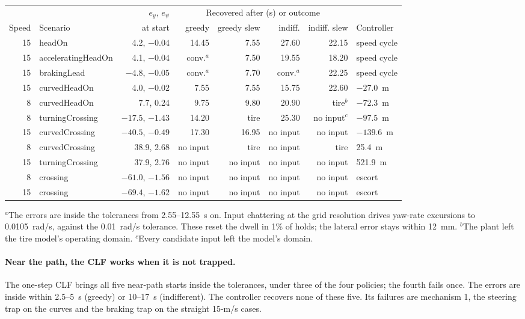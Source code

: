 \documentclass[11pt]{article}
\begin{document}
\begin{center}\footnotesize
\begin{tabular}{rlrrrrrl}
\toprule
 & & $e_y,\,e_\psi$ & \multicolumn{4}{c}{Recovered after (s) or outcome} & \\
Speed & Scenario & at start & greedy & greedy slew & indiff. & indiff. slew & Controller\\
\midrule
15 & headOn & 4.2, $-0.04$ & 14.45 & 7.55 & 27.60 & 22.15 & speed cycle\\
15 & acceleratingHeadOn & 4.1, $-0.04$ & conv.$^a$ & 7.50 & 19.55 & 18.20 & speed cycle\\
15 & brakingLead & $-4.8$, $-0.05$ & conv.$^a$ & 7.70 & conv.$^a$ & 22.25 & speed cycle\\
15 & curvedHeadOn & 4.0, $-0.02$ & 7.55 & 7.55 & 15.75 & 22.60 & $-27.0$~m\\
8 & curvedHeadOn & 7.7, 0.24 & 9.75 & 9.80 & 20.90 & tire$^b$ & $-72.3$~m\\
\midrule
8 & turningCrossing & $-17.5$, $-1.43$ & 14.20 & tire & 25.30 & no input$^c$ & $-97.5$~m\\
15 & curvedCrossing & $-40.5$, $-0.49$ & 17.30 & 16.95 & no input & no input & $-139.6$~m\\
8 & curvedCrossing & 38.9, 2.68 & no input & tire & no input & tire & 25.4~m\\
15 & turningCrossing & 37.9, 2.76 & no input & no input & no input & no input & 521.9~m\\
8 & crossing & $-61.0$, $-1.56$ & no input & no input & no input & no input & escort\\
15 & crossing & $-69.4$, $-1.62$ & no input & no input & no input & no input & escort\\
\bottomrule
\end{tabular}\end{center}
$^a$The errors are inside the tolerances from 2.55--12.55~s on. Input
chattering at the grid resolution drives yaw-rate excursions to 0.0105~rad/s,
against the 0.01~rad/s tolerance. These reset the dwell in 1\% of holds; the
lateral error stays within 12~mm.
$^b$The plant left the tire model's operating domain.
$^c$Every candidate input left the model's domain.

\paragraph{Near the path, the CLF works when it is not trapped.} The one-step
CLF brings all five near-path starts inside the tolerances, under three of the
four policies; the fourth fails once. The errors are inside within 2.5--5~s
(greedy) or 10--17~s (indifferent). The controller recovers none of these five.
Its failures are mechanism 1, the steering trap on the curves and the braking
trap on the straight 15-m/s cases.
\end{document}
